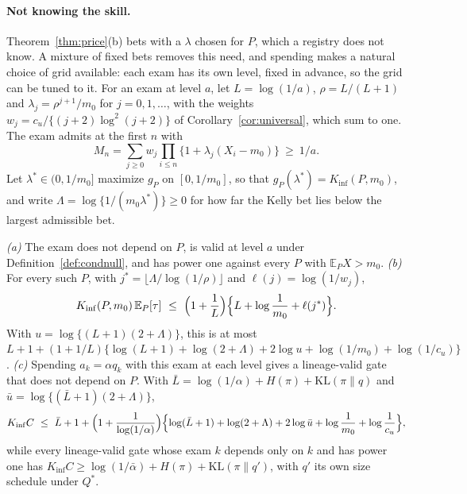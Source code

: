 \paragraph{Not knowing the skill.} Theorem~\ref{thm:price}(b) bets with a $\lambda$ chosen for $P$, which a registry does not know. A mixture of fixed bets removes this need, and spending makes a natural choice of grid available: each exam has its own level, fixed in advance, so the grid can be tuned to it. For an exam at level $a$, let $L=\log(1/a)$, $\rho=L/(L+1)$ and $\lambda_j=\rho^{j+1}/m_0$ for $j=0,1,\dots$, with the weights $w_j=c_u/\{(j+2)\log^2(j+2)\}$ of Corollary~\ref{cor:universal}, which sum to one. The exam admits at the first $n$ with
\[
M_n=\sum_{j\ge0}w_j\prod_{i\le n}\{1+\lambda_j(X_i-m_0)\}\ \ge\ 1/a .
\]
Let $\lambda^*\in(0,1/m_0]$ maximize $g_P$ on $[0,1/m_0]$, so that $g_P(\lambda^*)=K_{\inf}(P,m_0)$, and write $\Lambda=\log\{1/(m_0\lambda^*)\}\ge0$ for how far the Kelly bet lies below the largest admissible bet.
\begin{theorem}\label{thm:adaptive}
\emph{(a)} The exam does not depend on $P$, is valid at level $a$ under Definition~\ref{def:condnull}, and has power one against every $P$ with $\mathbb E_PX>m_0$.
\emph{(b)} For every such $P$, with $j^*=\lfloor\Lambda/\log(1/\rho)\rfloor$ and $\ell(j)=\log(1/w_j)$,
\[
K_{\inf}(P,m_0)\,\mathbb E_P[\tau]\ \le\ \Bigl(1+\frac1L\Bigr)\Bigl\{L+\log\frac1{m_0}+\ell(j^*)\Bigr\}.
\]
With $u=\log\{(L+1)(2+\Lambda)\}$, this is at most $L+1+(1+1/L)\{\log(L+1)+\log(2+\Lambda)+2\log u+\log(1/m_0)+\log(1/c_u)\}$.
\emph{(c)} Spending $a_k=\alpha q_k$ with this exam at each level gives a lineage-valid gate that does not depend on $P$. With $\bar L=\log(1/\alpha)+H(\pi)+\mathrm{KL}(\pi\|q)$ and $\bar u=\log\{(\bar L+1)(2+\Lambda)\}$,
\[
K_{\inf}C\ \le\ \bar L+1+\Bigl(1+\frac1{\log(1/\alpha)}\Bigr)\Bigl\{\log(\bar L+1)+\log(2+\Lambda)+2\log\bar u+\log\frac1{m_0}+\log\frac1{c_u}\Bigr\},
\]
while every lineage-valid gate whose exam $k$ depends only on $k$ and has power one has $K_{\inf}C\ge\log(1/\bar\alpha)+H(\pi)+\mathrm{KL}(\pi\|q')$, with $q'$ its own size schedule under $Q^*$.
\end{theorem}
